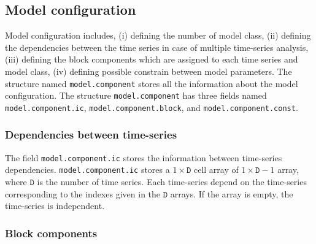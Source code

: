 \subsection{Model configuration}
\label{S:MODELCONFIGURATION}
Model configuration includes, (i) defining the number of model class, (ii) defining the dependencies between the time series in case of multiple time-series analysis, (iii) defining the block components which are assigned to each time series and model class, (iv) defining possible constrain between model parameters.
The \MATLAB{} structure named \lstinline[basicstyle = \mlttfamily]!model.component! stores all the information about the model configuration.
The structure \lstinline[basicstyle = \mlttfamily]!model.component! has three fields named  \lstinline[basicstyle = \mlttfamily]!model.component.ic!, \lstinline[basicstyle = \mlttfamily]!model.component.block!, and \lstinline[basicstyle = \mlttfamily]!model.component.const!.

\subsubsection{Dependencies between time-series}

The field \lstinline[basicstyle = \mlttfamily]!model.component.ic! stores the information between time-series dependencies.
\lstinline[basicstyle = \mlttfamily \small ]!model.component.ic! stores a $1\times \mathtt{D}$ cell array of $1\times \mathtt{D}-1$ array, where $\mathtt{D}$ is the number of time series.
Each time-series depend on the time-series corresponding to the indexes given in the $\mathtt{D}$ arrays.
If the array is empty, the time-series is independent.

\subsubsection{Block components}

